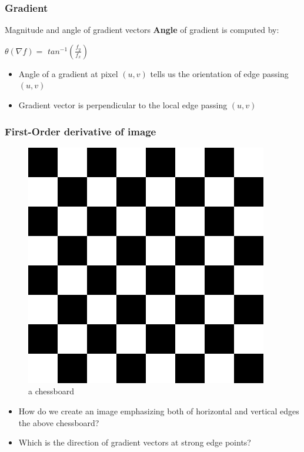 \documentclass[english,11pt,table,handout]{beamer}
\begin{document}
\frame
{
	\frametitle{Gradient}
	
	\begin{block}{Magnitude and angle of gradient vectors}
		\textbf{Angle} of gradient is computed by:
		
		$\theta(\nabla f)= $ 
		$tan^{-1}(\frac{f_{y}}{f_{x}})$
		
		\begin{itemize}
			\item Angle of a gradient at pixel $(u,v)$ tells us the orientation of edge passing $(u,v)$
			
			\item Gradient vector is perpendicular to the local edge passing $(u,v)$ 
		\end{itemize}
		
	\end{block}
	
}
\begin{frame}[fragile]
	
	\frametitle{First-Order derivative of image}
	\begin{exercise}
		\begin{figure}[!h]
			\includegraphics[scale=0.25]{checkboard.png}
			\caption{a chessboard}
		\end{figure}
		
		\begin{itemize}
			\item How do we create an image emphasizing both of horizontal and vertical edges the above chessboard?
			\item Which is the direction of gradient vectors at strong edge points?
		\end{itemize}
	\end{exercise}
	
\end{frame}
\end{document}
